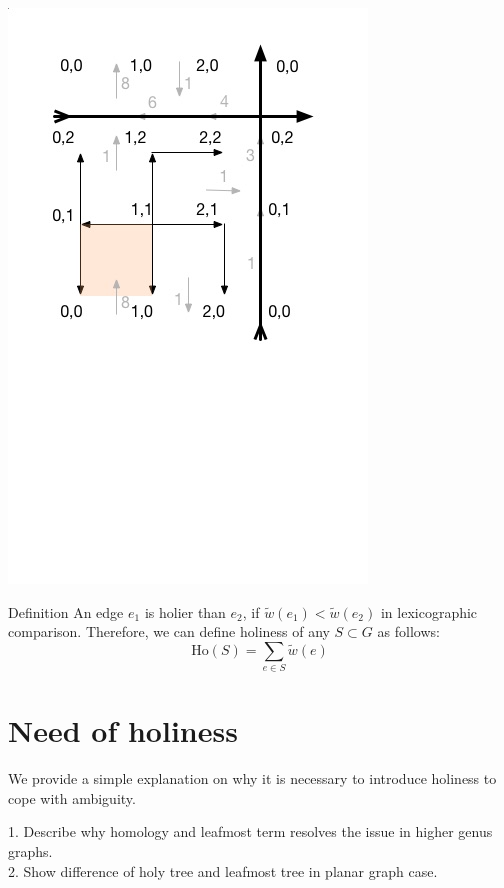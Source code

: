 \documentclass{article}
\begin{document}
\begin{center}
\includegraphics[scale = 0.5]{g1.jpg}
\end{center}
\vspace{-4.0cm} %

\begin{oneshot}{Definition}
An edge $e_1$ is holier than $e_2$, 
if $\tilde w(e_1) < \tilde w(e_2)$ in lexicographic comparison. 
Therefore, we can define holiness of any $S \subset G $ as follows:
\[\text{Ho}(S) = \sum \limits_{e \in S} \tilde w(e)\]
\end{oneshot}

\section{Need of holiness}
We provide a simple explanation on why it is necessary to introduce holiness
to cope with ambiguity. \\

\begin{center}
{\color{red}
1. Describe why homology and leafmost term resolves the issue in higher
genus graphs. 
\\ 
2. Show difference of holy tree and leafmost tree in planar graph case.}
\end{center}
\end{document}
